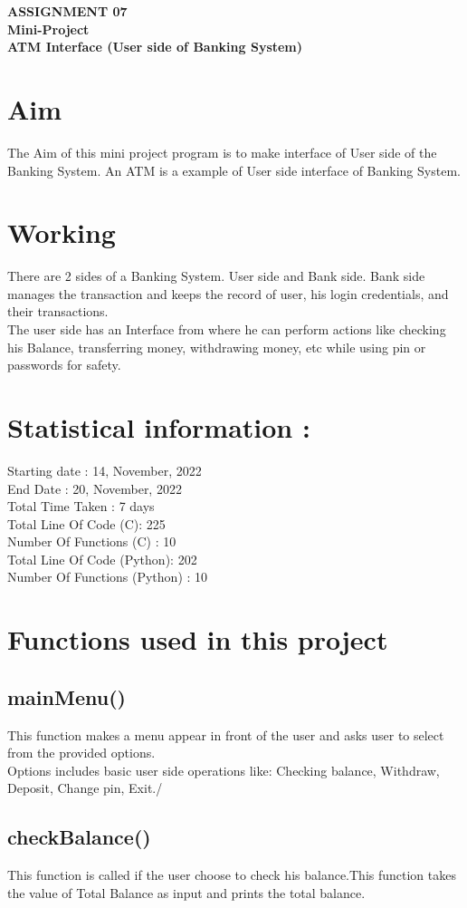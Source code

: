 \documentclass{article}
\begin{document}
\pagestyle{fancy}

\begin{center}
{\centering \Large{\textbf{\bf ASSIGNMENT 07\\Mini-Project\\ATM Interface (User side of Banking System)\\}}}\end{center}


\section{Aim}
The Aim of this mini project program is to make interface of User side of the Banking System.
An ATM is a example of User side interface of Banking System.

\section{Working}
There are 2 sides of a Banking System. User side and Bank side. Bank side manages the transaction and keeps the record of user, his login credentials, and their transactions.\\The user side has an Interface from where he can perform actions like checking his Balance, transferring money, withdrawing money, etc while using pin or passwords for safety.

\section{Statistical information :}
Starting date : 14, November, 2022\\
End Date : 20, November, 2022\\
Total Time Taken : 7 days\\
Total Line Of Code (C):  225\\
Number Of Functions (C) : 10\\
Total Line Of Code (Python): 202\\
Number Of Functions (Python) : 10\\

\section{Functions used in this project}
\subsection{mainMenu()}
This function makes a menu appear in front of the user and asks user to select from the provided options.\\Options includes basic user side operations like: Checking balance, Withdraw, Deposit, Change pin, Exit./\subsection{checkBalance()}
This function is called if the user choose to check his balance.This function takes the value of Total Balance as input and prints the total balance.
\end{document}
